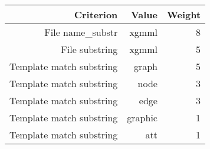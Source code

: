 \begin{tabular}{|r|r|r|}
\hline
\bf Criterion&\bf Value&\bf Weight\\
\hline
File name_substr&xgmml&8\\
\hline
File substring&xgmml&5\\
\hline
Template match substring&graph&5\\
\hline
Template match substring&node&3\\
\hline
Template match substring&edge&3\\
\hline
Template match substring&graphic&1\\
\hline
Template match substring&att&1\\
\hline
\end{tabular}
